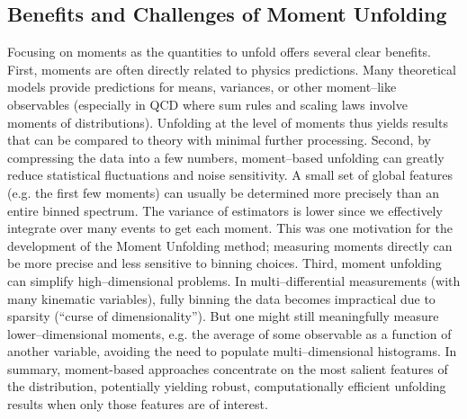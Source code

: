     \subsection{Benefits and Challenges of Moment Unfolding}
        Focusing on moments as the quantities to unfold offers several clear benefits.
        First, moments are often directly related to physics predictions.
        Many theoretical models provide predictions for means, variances, or other moment--like observables (especially in QCD where sum rules and scaling laws involve moments of distributions).
        Unfolding at the level of moments thus yields results that can be compared to theory with minimal further processing.\kd{}
        Second, by compressing the data into a few numbers, moment--based unfolding can greatly reduce statistical fluctuations and noise sensitivity.
        A small set of global features (e.g. the first few moments) can usually be determined more precisely than an entire binned spectrum.
        The variance of estimators is lower since we effectively integrate over many events to get each moment.
        This was one motivation for the development of the Moment Unfolding method;
        measuring moments directly can be more precise and less sensitive to binning choices.\kd{}
        Third, moment unfolding can simplify high--dimensional problems.
        In multi--differential measurements (with many kinematic variables), fully binning the data becomes impractical due to sparsity (“curse of dimensionality”).
        But one might still meaningfully measure lower--dimensional moments, e.g. the average of some observable as a function of another variable, avoiding the need to populate multi--dimensional histograms.
        In summary, moment-based approaches concentrate on the most salient features of the distribution, potentially yielding robust, computationally efficient unfolding results when only those features are of interest.

